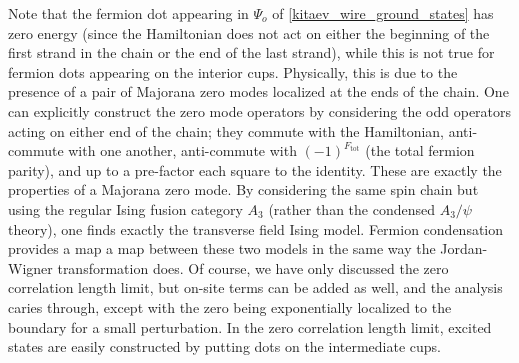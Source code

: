 Note that the fermion dot appearing in $\Psi_o$ of \eqref{kitaev_wire_ground_states} has zero energy (since the Hamiltonian does not act on either the beginning of the first strand in the chain or the end of the last strand), while this is not true for fermion dots 
appearing on the interior cups. 
Physically, this is due to the presence of a pair of Majorana zero modes localized at the ends of the chain. 
One can explicitly construct the zero mode operators by considering the odd operators acting on either end of the chain; 
they commute with the Hamiltonian, anti-commute with one another, anti-commute with $(-1)^{F_\text{tot}}$ (the total fermion parity), and up to a pre-factor each square to the identity.
These are exactly the properties of a Majorana zero mode.%
By considering the same spin chain but using the regular Ising fusion category $A_3$ (rather than the condensed $A_3/\psi$ theory), one finds exactly the transverse field Ising model. 
Fermion condensation provides a map a map between these two models in the same way the Jordan-Wigner transformation does.
Of course, we have only discussed the zero correlation length limit, but on-site terms can be added as well, and the analysis caries through, except with the zero being exponentially localized to the boundary for a small perturbation.
In the zero correlation length limit, excited states are easily constructed by putting dots on the intermediate cups. 


